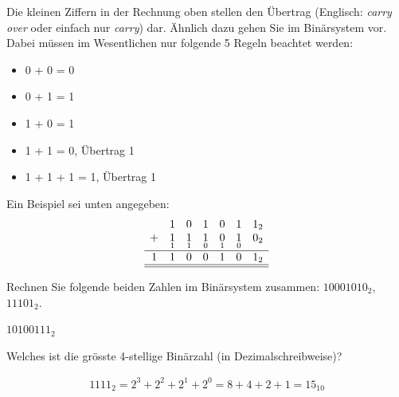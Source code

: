 Die kleinen Ziffern in der Rechnung oben stellen den Übertrag (Englisch: \textit{carry over} oder einfach nur \textit{carry}) dar. Ähnlich dazu gehen Sie im Binärsystem vor. Dabei müssen im Wesentlichen nur folgende 5 Regeln beachtet werden:

\begin{itemize}
	\item 0 + 0 = 0
	\item 0 + 1 = 1
	\item 1 + 0 = 1
	\item 1 + 1 = 0, Übertrag 1
	\item 1 + 1 + 1 = 1, Übertrag 1
\end{itemize}

Ein Beispiel sei unten angegeben:
\[
	\begin{array}{ccccccc}
		  & 1               & 0               & 1               & 0               & 1               & 1_2              \\
		+ & \underset{1}{1} & \underset{1}{1} & \underset{0}{1} & \underset{1}{0} & \underset{0}{1} & \underset{}{0_2} \\
		\hline
		1 & 1               & 0               & 0               & 1               & 0               & 1_2              \\\hline\hline
	\end{array}
\]

\begin{myexercise}
	Rechnen Sie folgende beiden Zahlen im Binärsystem zusammen: $10001010_2$, $11101_2$.
	\begin{myanswer}
		$10100111_2$
	\end{myanswer}
\end{myexercise}

\begin{myexercise}
	Welches ist die grösste 4-stellige Binärzahl (in Dezimalschreibweise)?
	\begin{myanswer}
		\begin{align*}
			1111_2 = 2^3 + 2^2 + 2^1 + 2^0 = 8 + 4 + 2 + 1 = 15_{10}
		\end{align*}
	\end{myanswer}
\end{myexercise}

